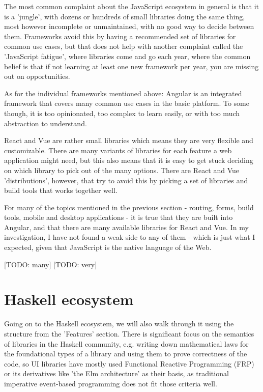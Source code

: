 \documentclass[english,odsaz]{fitthesis}
\begin{document}
The most common complaint about the JavaScript ecosystem in general is that it
is a 'jungle', with dozens or hundreds of small libraries doing the same thing,
most however incomplete or unmaintained, with no good way to decide between
them. Frameworks avoid this by having a recommended set of libraries for common
use cases, but that does not help with another complaint called the 'JavaScript
fatigue', where libraries come and go each year, where the common belief is that
if not learning at least one new framework per year, you are missing out on
opportunities.

As for the individual frameworks mentioned above: Angular is an integrated
framework that covers many common use cases in the basic platform. To some
though, it is too opinionated, too complex to learn easily, or with too much
abstraction to understand.

React and Vue are rather small libraries which means they are very flexible and
customizable. There are many variants of libraries for each feature a web
application might need, but this also means that it is easy to get stuck
deciding on which library to pick out of the many options. There are React and
Vue 'distributions', however, that try to avoid this by picking a set of libraries and
build tools that works together well.

For many of the topics mentioned in the previous section - routing, forms, build
tools, mobile and desktop applications - it is true that they are built into
Angular, and that there are many available libraries for React and Vue. In my
investigation, I have not found a weak side to any of them - which is just what
I expected, given that JavaScript is the native language of the Web.

[TODO: many]
[TODO: very]

\section{Haskell ecosystem}
\label{sec:orgf4db2d0}
Going on to the Haskell ecosystem, we will also walk through it using the
structure from the 'Features' section. There is significant focus on the
semantics of libraries in the Haskell community, e.g. writing down mathematical
laws for the foundational types of a library and using them to prove correctness
of the code, so UI libraries have mostly used Functional Reactive Programming
(FRP) or its derivatives like 'the Elm architecture' \cite{loder2018web} as their
basis, as traditional imperative event-based programming does not fit those
criteria well.
\end{document}
